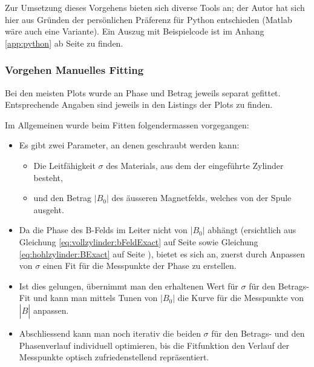 Zur  Umsetzung  dieses Vorgehens  bieten  sich  diverse  Tools an;  der  Autor
hat  sich  hier aus  Gr\"unden  der  pers\"onlichen Pr\"aferenz  f\"ur  Python
entschieden (Matlab  w\"are auch  eine Variante). Ein Auszug  mit Beispielcode
ist im Anhang \ref{app:python} ab Seite \pageref{app:python} zu finden.


\subsubsection{Vorgehen Manuelles Fitting}
\label{sec:ausw:subsec:methodik:subsubsec:fitting}

Bei   den  meisten   Plots  wurde   an  Phase   und  Betrag   jeweils  separat
gefittet. Entsprechende  Angaben sind  jeweils in  den Listings  der Plots  zu
finden.


Im Allgemeinen wurde beim Fitten  folgendermassen vorgegangen:

\begin{itemize}
    \item
        Es gibt zwei Parameter, an denen geschraubt werden kann:
        \begin{itemize}
            \item
                Die  Leitf\"ahigkeit  $\sigma$  des  Materials,  aus  dem  der
                eingef\"uhrte Zylinder besteht,
            \item
                und den Betrag $|B_0|$ des \"ausseren Magnetfelds, welches von
                der Spule ausgeht.
        \end{itemize}
    \item
        Da   die   Phase   des   B-Felds   im   Leiter   nicht   von   $|B_0|$
        abh\"angt (ersichtlich  aus Gleichung \ref{eq:vollzylinder:bFeldExact}
        auf       Seite       \pageref{eq:vollzylinder:bFeldExact}       sowie
        Gleichung        \ref{eq:hohlzylinder:BExact}         auf        Seite
        \pageref{eq:hohlzylinder:BExact}),  bietet es  sich  an, zuerst  durch
        Anpassen  von $\sigma$  einen Fit  f\"ur die  Messpunkte der  Phase zu
        erstellen.
    \item
        Ist dies gelungen, \"ubernimmt man  den erhaltenen Wert f\"ur $\sigma$
        f\"ur den Betrags-Fit und kann man mittels Tunen von $|B_0|$ die Kurve
        f\"ur die Messpunkte von $|\hat{B}|$ anpassen.
    \item
        Abschliessend  kann  man  noch  iterativ  die  beiden  $\sigma$  f\"ur
        den  Betrags- und  den Phasenverlauf  individuell optimieren,  bis die
        Fitfunktion  den  Verlauf  der  Messpunkte  optisch  zufriedenstellend
        repr\"asentiert.
\end{itemize}


